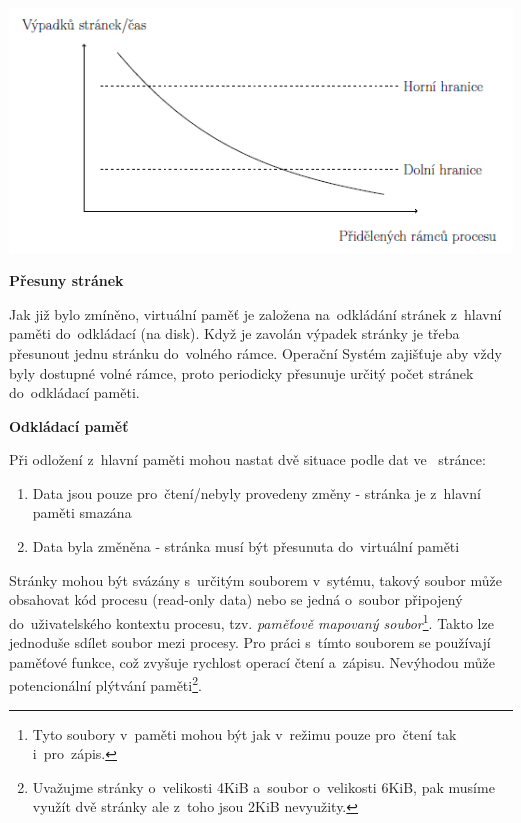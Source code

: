 \begin{center}
    \includegraphics[scale=1]{images/mem_freq_page.png}
\end{center}

\begin{Large}
    \vspace{0,5cm}
    \textbf{Přesuny stránek}
\end{Large}

Jak již bylo zmíněno, virtuální paměť je založena na~odkládání stránek z~hlavní paměti do~odkládací (na disk). Když je zavolán výpadek stránky je třeba přesunout jednu stránku do~volného rámce. Operační Systém zajišťuje aby vždy byly dostupné volné rámce, proto periodicky přesunuje určitý počet stránek do~odkládací paměti. 

\begin{large}
    \vspace{0,5cm}
    \textbf{Odkládací paměť}
\end{large}

Při odložení z~hlavní paměti mohou nastat dvě situace podle dat ve~ stránce:

\begin{enumerate}
    \item Data jsou pouze pro~čtení/nebyly provedeny změny - stránka je z~hlavní paměti smazána
    \item Data byla změněna - stránka musí být přesunuta do~virtuální paměti
\end{enumerate}

Stránky mohou být svázány s~určitým souborem v~sytému, takový soubor může obsahovat kód procesu (read-only data) nebo se jedná o~soubor připojený do~uživatelského kontextu procesu, tzv. \emph{paměťově mapovaný soubor}\footnote{Tyto soubory v~paměti mohou být jak v~režimu pouze pro~čtení tak i~pro~zápis.}. Takto lze jednoduše sdílet soubor mezi procesy. Pro práci s~tímto souborem se používají paměťové funkce, což zvyšuje rychlost operací čtení a~zápisu. Nevýhodou může potencionální plýtvání paměti\footnote{Uvažujme stránky o~velikosti 4KiB a~soubor o~velikosti 6KiB, pak musíme využít dvě stránky ale z~toho jsou 2KiB nevyužity.}. 

